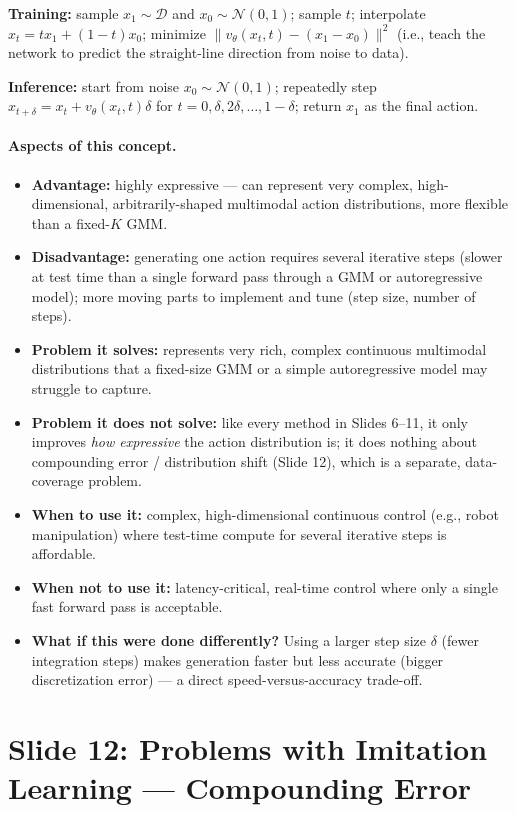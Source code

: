 \documentclass[11pt]{article}
\begin{document}
\textbf{Training:} sample $x_1\sim\mathcal{D}$ and $x_0\sim\mathcal{N}(0,1)$; sample $t$;
interpolate $x_t = tx_1+(1-t)x_0$; minimize $\|v_\theta(x_t,t)-(x_1-x_0)\|^2$ (i.e., teach
the network to predict the straight-line direction from noise to data).

\textbf{Inference:} start from noise $x_0\sim\mathcal{N}(0,1)$; repeatedly step
$x_{t+\delta} = x_t + v_\theta(x_t,t)\delta$ for $t=0,\delta,2\delta,\ldots,1-\delta$;
return $x_1$ as the final action.

\paragraph{Aspects of this concept.}
\begin{itemize}
\item \textbf{Advantage:} highly expressive --- can represent very complex,
high-dimensional, arbitrarily-shaped multimodal action distributions, more flexible than
a fixed-$K$ GMM.
\item \textbf{Disadvantage:} generating one action requires several iterative steps
(slower at test time than a single forward pass through a GMM or autoregressive model);
more moving parts to implement and tune (step size, number of steps).
\item \textbf{Problem it solves:} represents very rich, complex continuous multimodal
distributions that a fixed-size GMM or a simple autoregressive model may struggle to
capture.
\item \textbf{Problem it does not solve:} like every method in Slides 6--11, it only
improves \emph{how expressive} the action distribution is; it does nothing about
compounding error / distribution shift (Slide 12), which is a separate, data-coverage
problem.
\item \textbf{When to use it:} complex, high-dimensional continuous control (e.g.,
robot manipulation) where test-time compute for several iterative steps is affordable.
\item \textbf{When not to use it:} latency-critical, real-time control where only a
single fast forward pass is acceptable.
\item \textbf{What if this were done differently?} Using a larger step size $\delta$
(fewer integration steps) makes generation faster but less accurate (bigger
discretization error) --- a direct speed-versus-accuracy trade-off.
\end{itemize}

\section{Slide 12: Problems with Imitation Learning --- Compounding Error}
\end{document}
